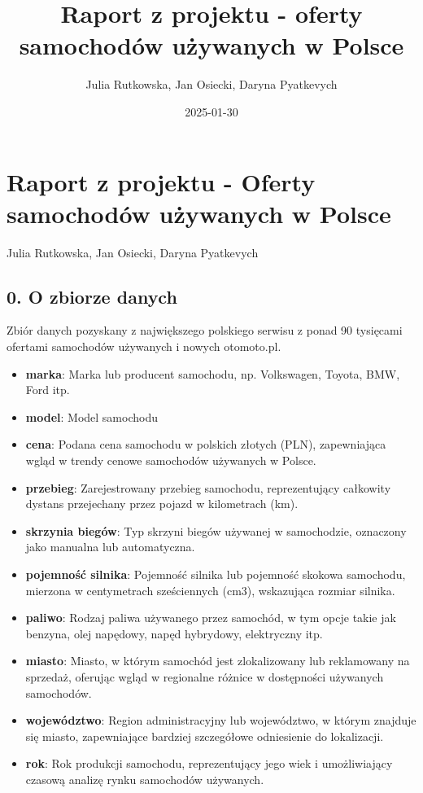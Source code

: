 \documentclass[
]{article}
\title{Raport z projektu - oferty samochodów używanych w Polsce}
\author{Julia Rutkowska, Jan Osiecki, Daryna Pyatkevych}
\date{2025-01-30}
\begin{document}
\maketitle

\section{Raport z projektu - Oferty samochodów używanych w
Polsce}\label{raport-z-projektu---oferty-samochoduxf3w-uux17cywanych-w-polsce}

Julia Rutkowska, Jan Osiecki, Daryna Pyatkevych

\subsection{0. O zbiorze danych}\label{o-zbiorze-danych}

Zbiór danych pozyskany z największego polskiego serwisu z ponad 90
tysięcami ofertami samochodów używanych i nowych otomoto.pl.

\begin{itemize}
\item
  \textbf{marka}: Marka lub producent samochodu, np. Volkswagen, Toyota,
  BMW, Ford itp.
\item
  \textbf{model}: Model samochodu
\item
  \textbf{cena}: Podana cena samochodu w polskich złotych (PLN),
  zapewniająca wgląd w trendy cenowe samochodów używanych w Polsce.
\item
  \textbf{przebieg}: Zarejestrowany przebieg samochodu, reprezentujący
  całkowity dystans przejechany przez pojazd w kilometrach (km).
\item
  \textbf{skrzynia biegów}: Typ skrzyni biegów używanej w samochodzie,
  oznaczony jako manualna lub automatyczna.
\item
  \textbf{pojemność silnika}: Pojemność silnika lub pojemność skokowa
  samochodu, mierzona w centymetrach sześciennych (cm3), wskazująca
  rozmiar silnika.
\item
  \textbf{paliwo}: Rodzaj paliwa używanego przez samochód, w tym opcje
  takie jak benzyna, olej napędowy, napęd hybrydowy, elektryczny itp.
\item
  \textbf{miasto}: Miasto, w którym samochód jest zlokalizowany lub
  reklamowany na sprzedaż, oferując wgląd w regionalne różnice w
  dostępności używanych samochodów.
\item
  \textbf{województwo}: Region administracyjny lub województwo, w którym
  znajduje się miasto, zapewniające bardziej szczegółowe odniesienie do
  lokalizacji.
\item
  \textbf{rok}: Rok produkcji samochodu, reprezentujący jego wiek i
  umożliwiający czasową analizę rynku samochodów używanych.
\end{itemize}
\end{document}
